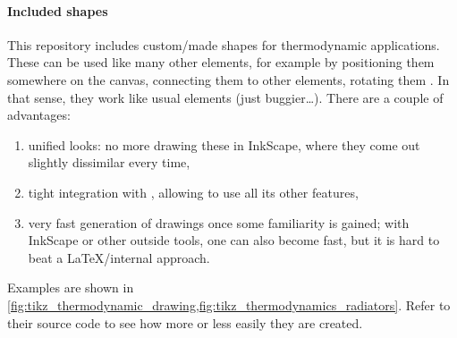 \begin{figure}
{
    }
\end{figure}

\paragraph{Included shapes}
This repository includes custom\-/made shapes for thermodynamic applications.
These can be used like many other  elements, for example by
positioning them somewhere on the canvas, connecting them to other elements,
rotating them .
In that sense, they work like usual  elements (just buggier\dots{}).
There are a couple of advantages:
\begin{enumerate}
    \item unified looks: no more drawing these in InkScape, where they come out
          slightly dissimilar every time,
    \item tight integration with , allowing to use all its other
          features,
    \item very fast generation of drawings once some familiarity is gained;
          with InkScape or other outside tools, one can also become fast, but it is
          hard to beat a \LaTeX{}\-/internal approach.
\end{enumerate}
Examples are shown in
\cref{fig:tikz_thermodynamic_drawing,fig:tikz_thermodynamics_radiators}.
Refer to their source code to see how more or less easily they are created.

